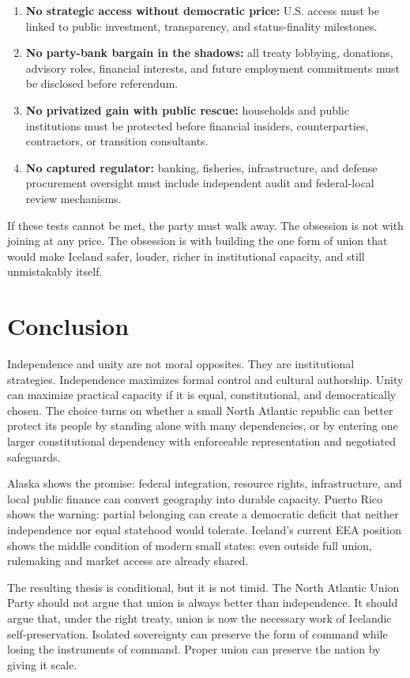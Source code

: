 \documentclass[11pt,a4paper]{article}
\newcommand{\PartyEN}{The North Atlantic Union Party}
\begin{document}
\begin{enumerate}
  \item \textbf{No strategic access without democratic price:} U.S. access must be linked to public investment, transparency, and status-finality milestones.
  \item \textbf{No party-bank bargain in the shadows:} all treaty lobbying, donations, advisory roles, financial interests, and future employment commitments must be disclosed before referendum.
  \item \textbf{No privatized gain with public rescue:} households and public institutions must be protected before financial insiders, counterparties, contractors, or transition consultants.
  \item \textbf{No captured regulator:} banking, fisheries, infrastructure, and defense procurement oversight must include independent audit and federal-local review mechanisms.
\end{enumerate}

If these tests cannot be met, the party must walk away. The obsession is not with joining at any price. The obsession is with building the one form of union that would make Iceland safer, louder, richer in institutional capacity, and still unmistakably itself.

\section{Conclusion}
Independence and unity are not moral opposites. They are institutional strategies. Independence maximizes formal control and cultural authorship. Unity can maximize practical capacity if it is equal, constitutional, and democratically chosen. The choice turns on whether a small North Atlantic republic can better protect its people by standing alone with many dependencies, or by entering one larger constitutional dependency with enforceable representation and negotiated safeguards.

Alaska shows the promise: federal integration, resource rights, infrastructure, and local public finance can convert geography into durable capacity. Puerto Rico shows the warning: partial belonging can create a democratic deficit that neither independence nor equal statehood would tolerate. Iceland's current EEA position shows the middle condition of modern small states: even outside full union, rulemaking and market access are already shared.

The resulting thesis is conditional, but it is not timid. \PartyEN{} should not argue that union is always better than independence. It should argue that, under the right treaty, union is now the necessary work of Icelandic self-preservation. Isolated sovereignty can preserve the form of command while losing the instruments of command. Proper union can preserve the nation by giving it scale.
\end{document}
